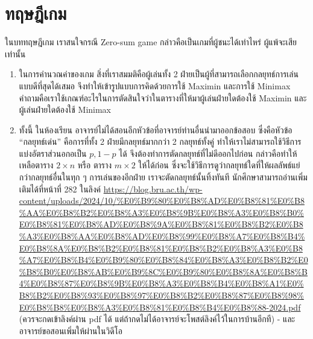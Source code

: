 \section*{ทฤษฎีเกม}
ในบททฤษฎีเกม เราสนใจกรณี Zero-sum game กล่าวคือเป็นเกมที่ผู้ชนะได้เท่าไหร่ ผู้แพ้จะเสียเท่านั้น
\begin{enumerate}
	\item ในการคำนวณค่าของเกม สิ่งที่เราสมมติคือผู้เล่นทั้ง 2 ฝ่ายเป็นผู้ที่สามารถเลือกกลยุทธ์การเล่นแบบดีที่สุดได้เสมอ จึงทำให้เข้ารูปแบบการคิดด้วยการใช้ Maximin และการใช้ Minimax คำถามคือเราใช้เกณฑ์อะไรในการตัดสินใจว่าในตารางที่ให้มาผู้เล่นฝ่ายใดต้องใช้ Maximin และผู้เล่นฝ่ายใดต้องใช้ Minimax
	\item ทั้งนี้ ในห้องเรียน อาจารย์ไม่ได้สอนอีกหัวข้อที่อาจารย์ท่านอื่นนำมาออกข้อสอบ ซึ่งคือหัวข้อ ``กลยุทธ์เด่น'' คือการที่ทั้ง 2 ฝ่ายมีกลยุทธ์มากกว่า 2 กลยุทธ์ทั้งคู่ ทำให้เราไม่สามารถใช้วิธีการแบ่งอัตราส่วนอกอเป็น $p, 1-p$ ได้ จึงต้องทำการตัดกลยุทธ์ที่ไม่ดีออกไปก่อน กล่าวคือทำให้เหลือตาราง $2\times n$ หรือ ตาราง $m \times 2$ ให้ได้ก่อน ซึ่งจะใช้วิธีการดูว่ากลยุทธ์ใดที่ให้ผลลัพธ์แย่กว่ากลยุทธ์อื่นในทุก ๆ การเล่นของอีกฝ่าย เราจะตัดกลยุทธ์นั้นทิ้งทันที นักศึกษาสามารถอ่านเพิ่มเติมได้ที่หน้าที่ 282 ในลิงค์ \url{https://blog.bru.ac.th/wp-content/uploads/2024/10/%E0%B9%80%E0%B8%AD%E0%B8%81%E0%B8%AA%E0%B8%B2%E0%B8%A3%E0%B8%9B%E0%B8%A3%E0%B8%B0%E0%B8%81%E0%B8%AD%E0%B8%9A%E0%B8%81%E0%B8%B2%E0%B8%A3%E0%B8%AA%E0%B8%AD%E0%B8%99%E0%B8%A7%E0%B8%B4%E0%B8%8A%E0%B8%B2%E0%B8%81%E0%B8%B2%E0%B8%A3%E0%B8%A7%E0%B8%B4%E0%B9%80%E0%B8%84%E0%B8%A3%E0%B8%B2%E0%B8%B0%E0%B8%AB%E0%B9%8C%E0%B9%80%E0%B8%8A%E0%B8%B4%E0%B8%87%E0%B8%9B%E0%B8%A3%E0%B8%B4%E0%B8%A1%E0%B8%B2%E0%B8%93%E0%B8%97%E0%B8%B2%E0%B8%87%E0%B8%98%E0%B8%B8%E0%B8%A3%E0%B8%81%E0%B8%B4%E0%B8%88-2024.pdf} (ควรจะกดเข้าลิงค์ผ่าน pdf ได้ แต่ถ้ากดไม่ได้อาจารย์จะโพสต์ลิงค์ไว้ในการบ้านอีกที) - และอาจารย์ขอสอนเพิ่มให้ผ่านในวิดีโอ
\end{enumerate}






